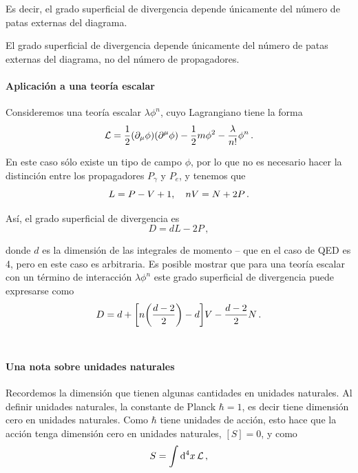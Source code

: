 Es decir, el grado superficial de divergencia depende únicamente del número de patas externas del diagrama.

\begin{cabox}
	El grado superficial de divergencia depende únicamente del número de patas externas del diagrama, no del número de propagadores.
\end{cabox}


\paragraph{Aplicación a una teoría escalar}
\vspace{2ex}

Consideremos una teoría escalar $\lambda \phi^n$, cuyo Lagrangiano tiene la forma
%
\begin{equation}
	\mathcal{L} = \frac{1}{2} (\partial_\mu \phi)(\partial^\mu \phi) - \frac{1}{2} m\phi^2 - \frac{\lambda}{n!} \phi^n \,.
\end{equation}

En este caso sólo existe un tipo de campo $\phi$, por lo que no es necesario hacer la distinción entre los propagadores $P_\gamma$ y $P_e$, y tenemos que
%
\begin{equation}
	L = P - V + 1 \qc nV = N + 2P \,.
\end{equation}

Así, el grado superficial de divergencia es
%
\begin{equation}
	D = dL - 2P \,,
\end{equation}

\noindent donde $d$ es la dimensión de las integrales de momento -- que en el caso de QED es 4, pero en este caso es arbitraria. Es posible mostrar que para una teoría escalar con un término de interacción $\lambda \phi^n$ este grado superficial de divergencia puede expresarse como
%
\begin{equation}
	D = d + \qty[n \qty(\frac{d-2}{2}) - d]V - \frac{d-2}{2}N \,.
\end{equation} \\

\paragraph{Una nota sobre unidades naturales}
\vspace{2ex}

Recordemos la dimensión que tienen algunas cantidades en unidades naturales. Al definir unidades naturales, la constante de Planck $\hbar = 1$, es decir tiene dimensión cero en unidades naturales. Como $\hbar$ tiene unidades de acción, esto hace que la acción tenga dimensión cero en unidades naturales, $[S] = 0$, y como
%
\begin{equation*}
	S = \int \dd[4]{x} \mathcal{L} \,,
\end{equation*}

